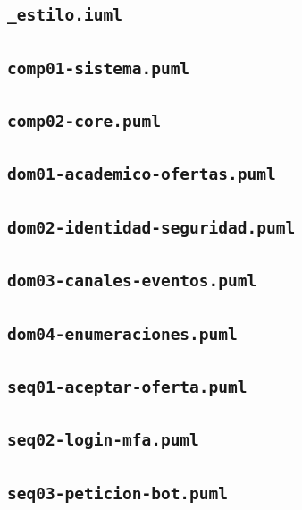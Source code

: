 \documentclass[11pt,a4paper]{report}
\begin{document}
\subsection*{\texttt{\_estilo.iuml}}

\subsection*{\texttt{comp01-sistema.puml}}

\subsection*{\texttt{comp02-core.puml}}

\subsection*{\texttt{dom01-academico-ofertas.puml}}

\subsection*{\texttt{dom02-identidad-seguridad.puml}}

\subsection*{\texttt{dom03-canales-eventos.puml}}

\subsection*{\texttt{dom04-enumeraciones.puml}}

\subsection*{\texttt{seq01-aceptar-oferta.puml}}

\subsection*{\texttt{seq02-login-mfa.puml}}

\subsection*{\texttt{seq03-peticion-bot.puml}}

\end{document}
